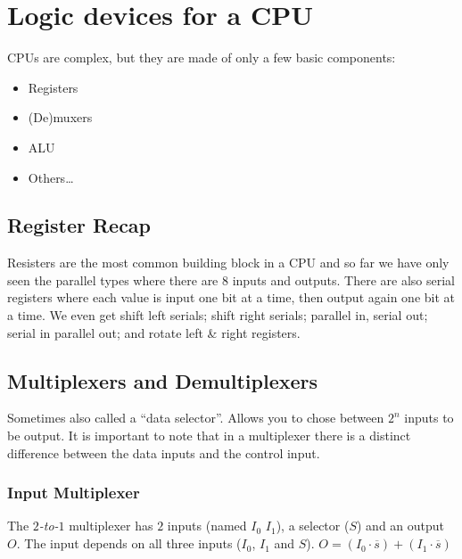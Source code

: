 \section{Logic devices for a CPU}\label{sec:logic_devices_for_a_cpu}

CPUs are complex, but they are made of only a few basic components:
\begin{itemize}
    \item Registers
    \item (De)muxers
    \item ALU
    \item Others\ldots
\end{itemize}

\subsection{Register Recap}\label{sub:register_recap}

Resisters are the most common building block in a CPU and so far we have only seen the parallel types where there are \(8\) inputs and outputs.
There are also serial registers where each value is input one bit at a time, then output again one bit at a time.
We even get shift left serials; shift right serials; parallel in, serial out; serial in parallel out; and rotate left \& right registers.

\subsection{Multiplexers and Demultiplexers}\label{sub:multiplexers_and_demultiplexers}

Sometimes also called a ``data selector''.
Allows you to chose between \(2^{n}\) inputs to be output.
It is important to note that in a multiplexer there is a distinct difference between the data inputs and the control input.

\subsubsection{Input Multiplexer}\label{ssub:input_multiplexer}

The \emph{\(2\)-to-\(1\)} multiplexer has \(2\) inputs (named \(I_0\) \(I_1\)), a selector (\(S\)) and an output \(O\).
The input depends on all three inputs (\(I_0\), \(I_1\) and \(S\)).
\(O = (I_0\cdot\overline{s}) + (I_1\cdot\overline{s})\)

